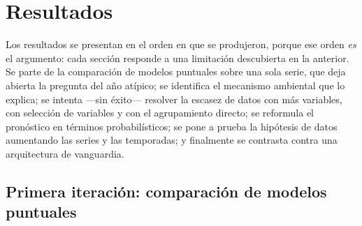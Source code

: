 \chapter{Resultados}
\label{cap:resultados}

Los resultados se presentan en el orden en que se produjeron, porque ese orden \emph{es} el
argumento: cada sección responde a una limitación descubierta en la anterior. Se parte de la
comparación de modelos puntuales sobre una sola serie, que deja abierta la pregunta del año
atípico; se identifica el mecanismo ambiental que lo explica; se intenta ---sin éxito---
resolver la escasez de datos con más variables, con selección de variables y con el agrupamiento directo;
se reformula el pronóstico en términos probabilísticos; se pone a prueba la hipótesis de datos
aumentando las series y las temporadas; y finalmente se contrasta contra una arquitectura de
vanguardia.

\section{Primera iteración: comparación de modelos puntuales}
\label{sec:res_primera}




